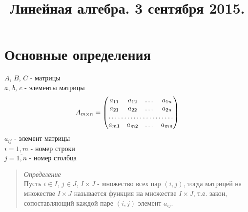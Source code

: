 \documentclass[11pt]{proc}
\title{Линейная алгебра. 3 сентября 2015.}
\begin{document}
\pagestyle{empty}
\maketitle

\section{Основные определения}
$A$, $B$, $C$ - матрицы\\
$a$, $b$, $c$ - элементы матрицы
\[	
A_{m\times n} = \begin{pmatrix}
		a_{11} & a_{12} & \dots & a_{1n}\\
		a_{21} & a_{22} & \dots & a_{2n}\\
		\hdotsfor{4}\\
		a_{m1} & a_{m2} & \dots & a_{mn}\\
	\end{pmatrix}
\]
$a_{ij}$ - элемент матрицы\\
$i = \overline{1,m}$ - номер строки\\
$j = \overline{1,n}$ - номер столбца\\
\begin{quote}
	\emph{Определение}\\
	Пусть $i \in I$, $j \in J$, $I \times J$ - множество всех пар $(i,j)$, тогда матрицей на множестве $I \times J$ называется функция на множестве $I \times J$, т.е. закон, сопоставляющий каждой паре $(i,j)$ элемент $a_{ij}$.
\end{quote}
\end{document}
